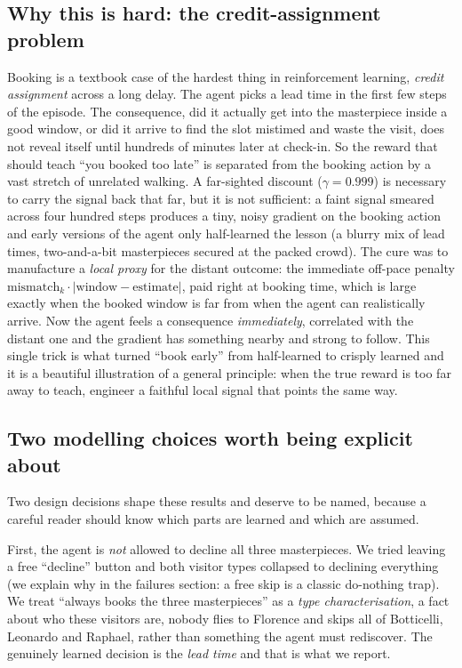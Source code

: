 \documentclass[11pt]{article}
\newcommand{\key}[1]{\textit{#1}}            %
\begin{document}
\subsection{Why this is hard: the credit-assignment problem}

Booking is a textbook case of the hardest thing in reinforcement learning, \key{credit
assignment} across a long delay. The agent picks a lead time in the first few steps of the
episode. The consequence, did it actually get into the masterpiece inside a good window, or
did it arrive to find the slot mistimed and waste the visit, does not reveal itself until
hundreds of minutes later at check-in. So the reward that should teach ``you booked too
late'' is separated from the booking action by a vast stretch of unrelated walking. A
far-sighted discount ($\gamma = 0.999$) is necessary to carry the signal back that far, but
it is not sufficient: a faint signal smeared across four hundred steps produces a tiny,
noisy gradient on the booking action and early versions of the agent only half-learned the
lesson (a blurry mix of lead times, two-and-a-bit masterpieces secured at the packed crowd).
The cure was to manufacture a \key{local proxy} for the distant outcome: the immediate
off-pace penalty $\text{mismatch}_k \cdot |\text{window} - \text{estimate}|$, paid right at
booking time, which is large exactly when the booked window is far from when the agent can
realistically arrive. Now the agent feels a consequence \emph{immediately}, correlated with
the distant one and the gradient has something nearby and strong to follow. This single
trick is what turned ``book early'' from half-learned to crisply learned and it is a
beautiful illustration of a general principle: when the true reward is too far away to
teach, engineer a faithful local signal that points the same way.

\subsection{Two modelling choices worth being explicit about}\label{sec:modelling}

Two design decisions shape these results and deserve to be named, because a careful reader
should know which parts are learned and which are assumed.

First, the agent is \emph{not} allowed to decline all three masterpieces. We tried leaving
a free ``decline'' button and both visitor types collapsed to declining everything (we
explain why in the failures section: a free skip is a classic do-nothing trap). We treat
``always books the three masterpieces'' as a \key{type characterisation}, a fact about who
these visitors are, nobody flies to Florence and skips all of Botticelli, Leonardo and
Raphael, rather than something the agent must rediscover. The genuinely learned decision is
the \emph{lead time} and that is what we report.
\end{document}

